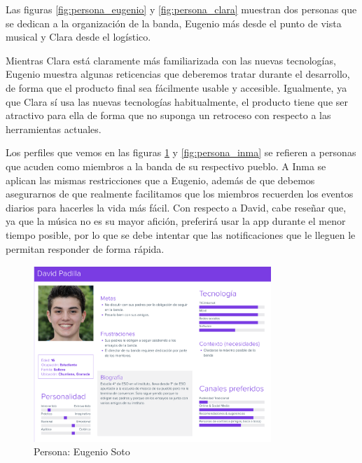 Las figuras \ref{fig:persona_eugenio} y \ref{fig:persona_clara} muestran dos personas que se dedican a la organización de la banda, Eugenio más desde el punto de vista musical y Clara desde el logístico.

Mientras Clara está claramente más familiarizada con las nuevas tecnologías, Eugenio muestra algunas reticencias que deberemos tratar durante el desarrollo, de forma que el producto final sea fácilmente usable y accesible. Igualmente, ya que Clara sí usa las nuevas tecnologías habitualmente, el producto tiene que ser atractivo para ella de forma que no suponga un retroceso con respecto a las herramientas actuales.

Los perfiles que vemos en las figuras \ref{fig:persona_david} y \ref{fig:persona_inma} se refieren a personas que acuden como miembros a la banda de su respectivo pueblo. A Inma se aplican las mismas restricciones que a Eugenio, además de que debemos asegurarnos de que realmente facilitamos que los miembros recuerden los eventos diarios para hacerles la vida más fácil. Con respecto a David, cabe reseñar que, ya que la música no es su mayor afición, preferirá usar la app durante el menor tiempo posible, por lo que se debe intentar que las notificaciones que le lleguen le permitan responder de forma rápida.



\begin{figure}[h]
\centering
\includegraphics[width=0.8\textwidth]{imagenes/personas/persona_david.png}
\caption{Persona: Eugenio Soto}
\label{fig:persona_david}
\end{figure}

